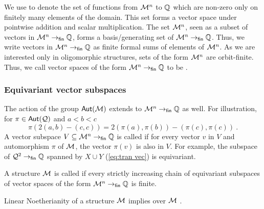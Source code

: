 \documentclass[a4paper,11pt]{article}
\begin{document}
We use  to denote the set of functions from $\mathcal{M}^n$ to $\mathbb{Q}$ which are non-zero only on finitely many elements of the domain.
This set forms a vector space under pointwise addition and scalar multiplication.
The set $\mathcal{M}^n$,
seen as a subset of vectors in $\mathcal{M}^n \to_{\mathsf{fin}} \mathbb{Q}$,
forms a basis/generating set of $\mathcal{M}^n \to_{\mathsf{fin}} \mathbb{Q}$.
Thus, we write vectors in $\mathcal{M}^n \to_{\mathsf{fin}} \mathbb{Q}$ as finite formal sums of elements of $\mathcal{M}^n$.
As we are interested only in oligomorphic structures,
sets of the form $\mathcal{M}^n$ are orbit-finite.
Thus, we call vector spaces of the form $\mathcal{M}^n \to_{\mathsf{fin}} \mathbb{Q}$ to be .
%
%
%
%
\subsubsection{Equivariant vector subspaces}\label{subsec:equiv}
%
The action of the group $\mathsf{Aut}{\left(\mathcal{M}\right)}$ extends to $\mathcal{M}^n \to_{\mathsf{fin}} \mathbb{Q}$ as well.
For illustration,
for $\pi\in\mathsf{Aut}{\left(\mathcal{Q}\right)}$ and $a < b < c$
\[
\pi(2(a,b) - (c,c)) =
2(\pi(a),\pi(b)) - (\pi(c),\pi(c)) \ .
\]
A vector subspace $V\subseteq \mathcal{M}^n \to_{\mathsf{fin}} \mathbb{Q}$ is called  if for every vector $v$ in $V$ and automorphism $\pi$ of $\mathcal{M}$,
the vector $\pi(v)$ is also in $V$.
For example,
the subspace of $\mathcal{Q}^2 \to_{\mathsf{fin}} \mathbb{Q}$ spanned by $X\cup Y$ (\cref{eq:tran vec}) is equivariant.
%
\begin{definition}\label{def:lin noe}
A structure $\mathcal{M}$ is called 
\label{page:lin noe}
if every strictly increasing chain of equivariant subspaces of vector spaces of the form $\mathcal{M}^n \to_{\mathsf{fin}} \mathbb{Q}$ is finite.
\end{definition}
%
Linear Noetherianity of a structure $\mathcal{M}$ implies  over $\mathcal{M}$ .
\end{document}
